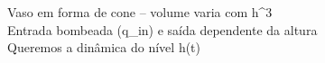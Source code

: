 \documentclass[preview]{standalone}
\begin{document}
Vaso em forma de cone -- volume varia com h^{3}\\Entrada bombeada (q\_in) e saída dependente da altura\\Queremos a dinâmica do nível h(t)\\
\end{document}
